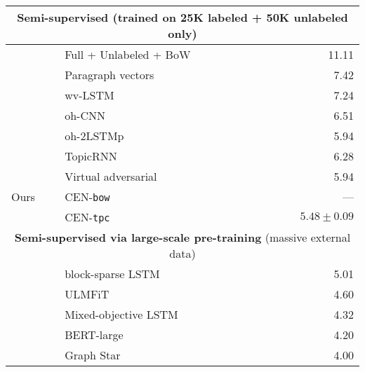 \documentclass[twoside,11pt]{article}
\begin{document}
\begin{table}[t]
\begin{tabular}{@{}llr@{}}
    \midrule
    \multicolumn{3}{c}{\textbf{Semi-supervised} (trained on 25K labeled + 50K unlabeled only)}                                          \\
    \midrule
    \citet{Maas:2011:LWV:2002472.2002491}           & Full + Unlabeled + BoW                    & 11.11                                 \\
    \citet{le2014distributed}                       & Paragraph vectors                         &  7.42                                 \\
    \citet{dai2015semi}                             & wv-LSTM                                   &  7.24                                 \\
    \citet{johnson2015semi}                         & oh-CNN                                    &  6.51                                 \\
    \citet{johnson2016supervised}                   & oh-2LSTMp                                 &  5.94                  \\
    \citet{Adji2017TopicRNN}                        & TopicRNN                                  &  6.28                                 \\
    \citet{miyato2016adversarial}                   & Virtual adversarial                       &  5.94                  \\
    \midrule
    Ours                                            & CEN-\texttt{bow}                          & ---                                   \\
                                                    & CEN-\texttt{tpc}                          & $\boldsymbol{5.48} \pm 0.09$          \\
    \midrule
    \multicolumn{3}{c}{\textbf{Semi-supervised via large-scale pre-training} (massive external data)}                                   \\
    \midrule
    \citet{gray2017gpu}                             & block-sparse LSTM                         &  5.01                                 \\
    \citet{howard2018universal}                     & ULMFiT                                    &  4.60                                 \\
    \citet{sachan2019revisiting}                    & Mixed-objective LSTM                      &  4.32                                 \\
    \citet{xie2019unsupervised}                     & BERT-large                                &  4.20                                 \\
    \citet{haonan2019graph}                         & Graph Star                                &  4.00                                 \\
    \bottomrule
\end{tabular}
\end{table}
 
\end{document}

